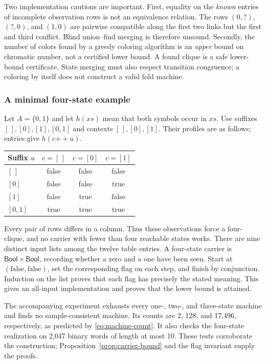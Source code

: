 \documentclass[11pt,a4paper]{article}
\newcommand{\Bool}{\mathsf{Bool}}
\newcommand{\nil}{[\,]}
\newcommand{\app}{\mathbin{+\!+}}
\theoremstyle{remark}
\begin{document}
Two implementation cautions are important. First, equality on the
\emph{known} entries of incomplete observation rows is not an equivalence
relation. The rows $(0,?)$, $(?,0)$, and $(1,0)$ are pairwise compatible along
the first two links but the first and third conflict. Blind union--find
merging is therefore unsound. Secondly, the number of colors found by a
greedy coloring algorithm is an \emph{upper} bound on chromatic number, not
a certified lower bound. A found clique is a safe lower-bound certificate.
State merging must also respect transition congruence; a coloring by itself
does not construct a valid fold machine.

\subsubsection*{A minimal four-state example}

Let $A=\{0,1\}$ and let $h(xs)$ mean that both symbols occur in $xs$.
Use suffixes $\nil,[0],[1],[0,1]$ and contexts $\nil,[0],[1]$. Their profiles
are as follows; entries give $h(c\app u)$.

\begin{center}
\begin{tabular}{@{}lccc@{}}
\toprule
Suffix $u$ & $c=\nil$ & $c=[0]$ & $c=[1]$\\
\midrule
$\nil$ & false & false & false\\
$[0]$ & false & false & true\\
$[1]$ & false & true & false\\
$[0,1]$ & true & true & true\\
\bottomrule
\end{tabular}
\end{center}

Every pair of rows differs in a column. Thus these observations force a
four-clique, and no carrier with fewer than four reachable states works.
There are nine distinct input lists among the twelve table entries. A
four-state carrier is $\Bool\times\Bool$, recording whether a zero and a
one have been seen. Start at $(\mathrm{false},\mathrm{false})$, set the
corresponding flag on each step, and finish by conjunction. Induction on the
list proves that each flag has precisely the stated meaning. This gives an
all-input implementation and proves that the lower bound is attained.

The accompanying experiment exhausts every one-, two-, and three-state
machine and finds no sample-consistent machine. Its counts are 2, 128, and
17,496, respectively, as predicted by \eqref{eq:machine-count}. It also
checks the four-state realization on 2,047 binary words of length at most
10. These tests corroborate the construction; Proposition~\ref{prop:carrier-bound}
and the flag invariant supply the proofs.
\end{document}
